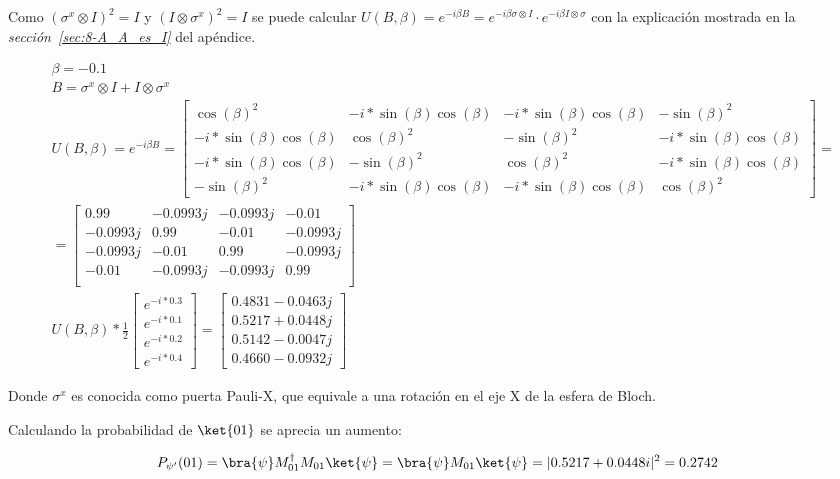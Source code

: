 Como ${(\sigma^x \otimes I)}^2 = I$ y ${(I \otimes \sigma^x)}^2 = I$ se puede calcular $U(B, \beta) = e^{-i \beta B} = e^{-i \beta \sigma \otimes I} \cdot e^{-i \beta I \otimes \sigma}$ con la explicación mostrada en la \textit{sección~\ref{sec:8-A_A_es_I}} del apéndice.

\begin{align}
  &\beta = - 0.1 \\
  &B = \sigma^x \otimes I + I \otimes \sigma^x \\
  &U(B, \beta) = e^{-i \beta B} = \begin{bmatrix}
    {\cos(\beta)}^2       & -i*\sin(\beta)\cos(\beta) & -i*\sin(\beta)\cos(\beta) & -{\sin(\beta)}^2      \\
    -i*\sin(\beta)\cos(\beta) & {\cos(\beta)}^2       & -{\sin(\beta)}^2      & -i*\sin(\beta)\cos(\beta) \\
    -i*\sin(\beta)\cos(\beta) & -{\sin(\beta)}^2      & {\cos(\beta)}^2       & -i*\sin(\beta)\cos(\beta) \\
    -{\sin(\beta)}^2      & -i*\sin(\beta)\cos(\beta) & -i*\sin(\beta)\cos(\beta) & {\cos(\beta)}^2
  \end{bmatrix} = \nonumber \\
  &= \begin{bmatrix}
    0.99     & -0.0993j & -0.0993j & -0.01    \\
    -0.0993j & 0.99     & -0.01    & -0.0993j \\
    -0.0993j & -0.01    & 0.99     & -0.0993j \\
    -0.01    & -0.0993j & -0.0993j & 0.99     \\
  \end{bmatrix} \\
  &U(B, \beta)* \frac{1}{2} \begin{bmatrix}
    e^{-i * 0.3} \\
    e^{-i * 0.1} \\
    e^{-i * 0.2} \\
    e^{-i * 0.4}
  \end{bmatrix} = \begin{bmatrix}
    0.4831 -0.0463j \\
    0.5217 +0.0448j \\
    0.5142 -0.0047j \\
    0.4660 -0.0932j
    \end{bmatrix}
\end{align}

Donde $\sigma^x$ es conocida como puerta Pauli-X, que equivale a una rotación en el eje X de la esfera de Bloch.

Calculando la probabilidad de $\ket{01}$ se aprecia un aumento:

\begin{align}
  P_{\psi'}(01) = \bra{\psi}M_{01}^\dagger M_{01}\ket{\psi} = \bra{\psi}M_{01}\ket{\psi} = |0.5217 +0.0448i|^2 = 0.2742
\end{align}





